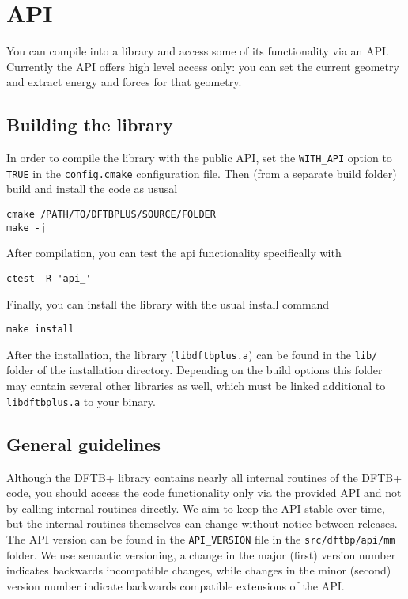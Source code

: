 \chapter{\dftbp{} API}

You can compile \dftbp{} into a library and access some of its functionality via
an API. Currently the API offers high level access only: you can set the current
geometry and extract energy and forces for that geometry.

\section{Building the library}

In order to compile the \dftbp{} library with the public API, set the
\verb|WITH_API| option to \verb|TRUE| in the \verb|config.cmake| configuration
file. Then (from a separate build folder) build and install the code as ususal
\begin{verbatim}
cmake /PATH/TO/DFTBPLUS/SOURCE/FOLDER
make -j
\end{verbatim}

After compilation, you can test the api functionality specifically with
\begin{verbatim}
ctest -R 'api_'
\end{verbatim}

Finally, you can install the library with the usual install command
\begin{verbatim}
make install
\end{verbatim}

After the installation, the library (\verb|libdftbplus.a|) can be found in the
\verb|lib/| folder of the installation directory. Depending on the build options
this folder may contain several other libraries as well, which must be linked
additional to \verb|libdftbplus.a| to your binary.

\section{General guidelines}

Although the DFTB+ library contains nearly all internal routines of the DFTB+
code, you should access the code functionality only via the provided API and not
by calling internal routines directly. We aim to keep the API stable over time,
but the internal routines themselves can change without notice between
releases. The API version can be found in the \verb|API_VERSION| file in the
\verb|src/dftbp/api/mm| folder. We use semantic versioning, a change in the
major (first) version number indicates backwards incompatible changes, while
changes in the minor (second) version number indicate backwards compatible
extensions of the API.

